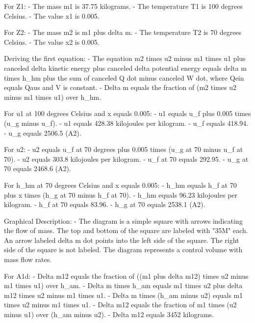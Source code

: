 For Z1:
- The mass m1 is 37.75 kilograms.
- The temperature T1 is 100 degrees Celsius.
- The value x1 is 0.005.

For Z2:
- The mass m2 is m1 plus delta m.
- The temperature T2 is 70 degrees Celsius.
- The value x2 is 0.005.

Deriving the first equation:
- The equation m2 times u2 minus m1 times u1 plus canceled delta kinetic energy plus canceled delta potential energy equals delta m times h_hm plus the sum of canceled Q dot minus canceled W dot, where Qein equals Qaus and V is constant.
- Delta m equals the fraction of (m2 times u2 minus m1 times u1) over h_hm.

For u1 at 100 degrees Celsius and x equals 0.005:
- u1 equals u_f plus 0.005 times (u_g minus u_f).
- u1 equals 428.38 kilojoules per kilogram.
- u_f equals 418.94.
- u_g equals 2506.5 (A2).

For u2:
- u2 equals u_f at 70 degrees plus 0.005 times (u_g at 70 minus u_f at 70).
- u2 equals 303.8 kilojoules per kilogram.
- u_f at 70 equals 292.95.
- u_g at 70 equals 2468.6 (A2).

For h_hm at 70 degrees Celsius and x equals 0.005:
- h_hm equals h_f at 70 plus x times (h_g at 70 minus h_f at 70).
- h_hm equals 96.23 kilojoules per kilogram.
- h_f at 70 equals 83.96.
- h_g at 70 equals 2538.1 (A2).

Graphical Description:
- The diagram is a simple square with arrows indicating the flow of mass. The top and bottom of the square are labeled with "35M" each. An arrow labeled delta m dot points into the left side of the square. The right side of the square is not labeled. The diagram represents a control volume with mass flow rates.

For A1d:
- Delta m12 equals the fraction of ((m1 plus delta m12) times u2 minus m1 times u1) over h_am.
- Delta m times h_am equals m1 times u2 plus delta m12 times u2 minus m1 times u1.
- Delta m times (h_am minus u2) equals m1 times u2 minus m1 times u1.
- Delta m12 equals the fraction of m1 times (u2 minus u1) over (h_am minus u2).
- Delta m12 equals 3452 kilograms.